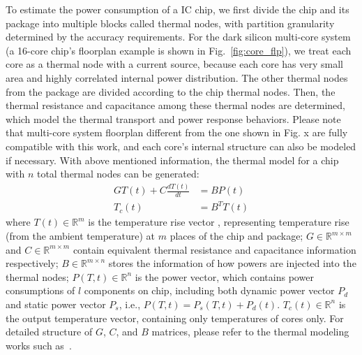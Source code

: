 To estimate the power consumption of a IC chip, we first divide the chip and its package into multiple blocks called thermal nodes, with partition granularity determined by the accuracy requirements. For the dark silicon multi-core system (a 16-core chip's floorplan example is shown in Fig.~\ref{fig:core_flp}), we treat each core as a thermal node with a current source, because each core has very small area and highly correlated internal power distribution. The other thermal nodes from the package are divided according to the chip thermal nodes. Then, the thermal resistance and capacitance among these thermal nodes are determined, which model the thermal transport and power response behaviors. Please note that multi-core system floorplan different from the one shown in Fig. x are fully compatible with this work, and each core's internal structure can also be modeled if necessary. With above mentioned information, the thermal model for a chip with $n$ total thermal nodes can be generated:
\begin{equation}\label{eq:gt}
\begin{split}
GT(t) + C\frac{dT(t)}{dt} &= BP(t)\\
T_{c}(t) &= B^{T}T(t)
\end{split}
\end{equation}
where $T(t) \in \mathbb{R}^m$ is the temperature rise vector , representing temperature rise (from the ambient temperature) at $m$ places of the chip and package; $G \in \mathbb{R}^{m\times m}$ and  $C \in \mathbb{R}^{m \times m}$ contain equivalent thermal resistance and capacitance information respectively; $B \in \mathbb{R}^{m \times n}$ stores the information of how powers are injected into the thermal nodes; $P(T, t) \in \mathbb{R}^{n}$ is the power vector, which contains power consumptions of $l$ components on chip, including both dynamic power vector $P_d$ and static power vector $P_s$, i.e., $P(T, t)=P_s(T, t)+P_d(t)$. $T_{c}(t) \in \mathbb{R}^n$ is the output temperature vector, containing only temperatures of cores only. For detailed structure of $G$, $C$, and $B$ matrices, please refer to the thermal modeling works such as~\cite{Huang:TVLSI'06,Huang:TC'08,WangTan:TODAES'13,Hanumaiah:TCAD'11}.